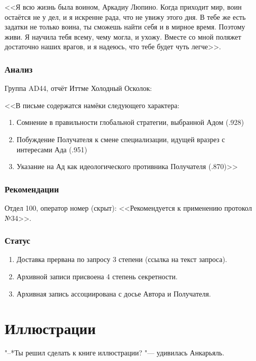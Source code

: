 \documentclass[a4paper,10pt]{book}
\begin{document}
<<Я всю жизнь была воином, Аркадиу Люпино. Когда приходит мир, воин остаётся не 
у дел, и я искренне рада, что не увижу этого дня. В тебе же есть задатки не 
только воина, ты сможешь найти себя и в мирное время. Поэтому живи. Я научила 
тебя всему, чему могла, и ухожу. Вместе со мной поляжет достаточно наших 
врагов, и я надеюсь, что тебе будет чуть легче>>.

\subsubsection{Анализ}

Группа AD44, отчёт Иттме Холодный Осколок:

<<В письме содержатся намёки следующего характера:

\begin{enumerate}
\item Сомнение в правильности глобальной стратегии, выбранной Адом (.928)
\item Побуждение Получателя к смене специализации, идущей вразрез с интересами 
Ада (.951)
\item Указание на Ад как идеологического противника Получателя (.870)>>
\end{enumerate}

\subsubsection{Рекомендации}

Отдел 100, оператор номер (скрыт): <<Рекомендуется к применению протокол №34>>.

\subsubsection{Статус}

\begin{enumerate}
\item Доставка прервана по запросу 3 степени (ссылка на текст запроса).
\item Архивной записи присвоена 4 степень секретности.
\item Архивная запись ассоциирована с досье Автора и Получателя.
\end{enumerate}


\section{Иллюстрации}

"--*Ты решил сделать к книге иллюстрации? "--- удивилась Анкарьяль.
\end{document}
